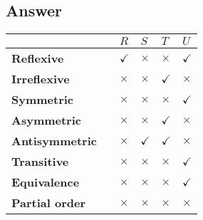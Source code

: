 \subsection{Answer}
\begin{center}
\begin{tabular}{|l|l|l|l|l|l|}
\hline
						&	&	$R$	&	$S$	&	$T$	& $U$\\
\hline
\textbf{Reflexive} 	    &   &$\checkmark$		&$\times$		&$\times$	&$\checkmark$	 \\
\hline
\textbf{Irreflexive} 	&   &$\times$		&$\times$		&$\checkmark$	&$\times$	 \\
\hline
\textbf{Symmetric} 	    &   &$\times$		&$\times$		&$\times$	&$\checkmark$	 \\
\hline
\textbf{Asymmetric} 	&   &$\times$		&$\times$		&$\checkmark$	&$\times$	 \\
\hline
\textbf{Antisymmetric}  &   &$\times$		&$\checkmark$		&$\checkmark$	&$\times$	 \\
\hline
\textbf{Transitive} 	&   &$\times$		&$\times$		&$\times$	&$\checkmark$	 \\
\hline
\textbf{Equivalence} 	&   &$\times$		&$\times$		&$\times$	&$\checkmark$	 \\
\hline
\textbf{Partial order} 	&   &$\times$		&$\times$		&$\times$	&$\times$	 \\
\hline
\end{tabular}
\end{center}

